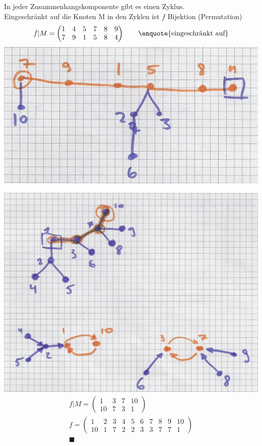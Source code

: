 \begin{satz*}[note = (Cayley)]
\begin{bew}
		In jeder Zusammenhangskomponente gibt es einen Zyklus.\\
		Eingeschränkt auf die Knoten M in den Zyklen ist $f$ Bijektion (Permutation)\\
		\[ f|M = \begin{pmatrix}
			1	&4	&5	&7	&8	&9	\\
			7	&9	&1	&5	&8	&4	
		\end{pmatrix} \qquad \text{\enquote{eingeschränkt auf}} \]
		\includegraphics[width=\textwidth]{Bild42}
	\end{bew}
	\begin{bew}[head = Beweis der Umkehrrichtung:]
		\includegraphics[width=\textwidth]{Bild43}
		\begin{gather*}
			f|M = \begin{pmatrix}
				1	&3	&7	&10	\\
				10	&7	&3	&1	
			\end{pmatrix}\\
			f = \begin{pmatrix}
				1	&2	&3	&4	&5	&6	&7	&8	&9	&10	\\
				10	&1	&7	&2	&2	&3	&3	&7	&7	&1	
			\end{pmatrix}\\
			\blacksquare
		\end{gather*}
	\end{bew}
\end{satz*}
